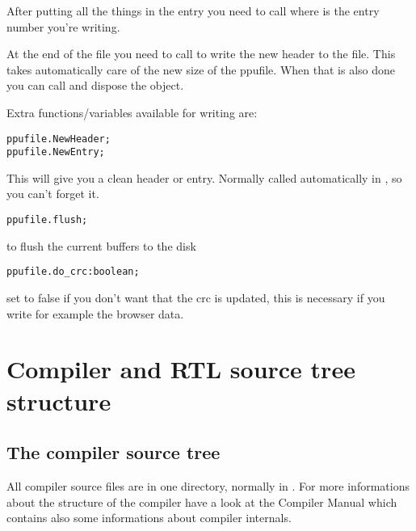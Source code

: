 \documentclass{report}
\begin{document}
After putting all the things in the entry you need to call
 where  is the entry number 
you're writing.

At the end of the file you need to call  to write the
new header to the file. This takes automatically care of the new size of the
ppufile. When that is also done you can call  and dispose the
object.

Extra functions/variables available for writing are:
\begin{verbatim}
ppufile.NewHeader;                                           
ppufile.NewEntry;   
\end{verbatim}
This will give you a clean header or entry. Normally called automatically
in , so you can't forget it.
\begin{verbatim}
ppufile.flush;                                                            
\end{verbatim}

to flush the current buffers to the disk
\begin{verbatim}
ppufile.do_crc:boolean;
\end{verbatim}
set to false if you don't want that the crc is updated, this is necessary
if you write for example the browser data.
   

\chapter{Compiler and RTL source tree structure}
\label{ch:AppB}

\section{The compiler source tree}

All compiler source files are in one directory, normally in
. For more informations
about the structure of the compiler have a look at the
Compiler Manual which contains also some informations about
compiler internals.

\end{document}
